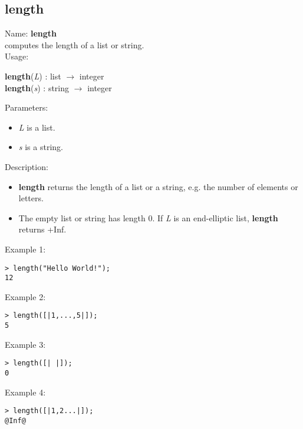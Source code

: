 \subsection{ length }
\noindent Name: \textbf{length}\\
computes the length of a list or string.\\

\noindent Usage: 
\begin{center}
\textbf{length}(\emph{L}) : \textsf{list} $\rightarrow$ \textsf{integer}\\
\textbf{length}(\emph{s}) : \textsf{string} $\rightarrow$ \textsf{integer}\\
\end{center}
Parameters: 
\begin{itemize}
\item \emph{L} is a list.
\item \emph{s} is a string.
\end{itemize}
\noindent Description: \begin{itemize}

\item \textbf{length} returns the length of a list or a string, e.g. the number of elements
   or letters.

\item The empty list or string has length 0.
   If \emph{L} is an end-elliptic list, \textbf{length} returns +Inf.
\end{itemize}
\noindent Example 1: 
\begin{center}\begin{minipage}{15cm}\begin{Verbatim}[frame=single]
> length("Hello World!");
12
\end{Verbatim}
\end{minipage}\end{center}
\noindent Example 2: 
\begin{center}\begin{minipage}{15cm}\begin{Verbatim}[frame=single]
> length([|1,...,5|]);
5
\end{Verbatim}
\end{minipage}\end{center}
\noindent Example 3: 
\begin{center}\begin{minipage}{15cm}\begin{Verbatim}[frame=single]
> length([| |]);
0
\end{Verbatim}
\end{minipage}\end{center}
\noindent Example 4: 
\begin{center}\begin{minipage}{15cm}\begin{Verbatim}[frame=single]
> length([|1,2...|]);
@Inf@
\end{Verbatim}
\end{minipage}\end{center}

